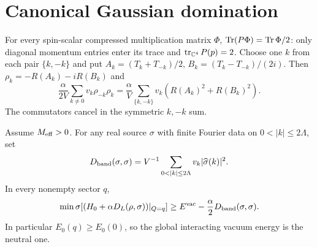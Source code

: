 \section{Canonical Gaussian domination}
For every spin-scalar compressed multiplication matrix $\Phi$,
$\operatorname{Tr}(P\Phi)=\operatorname{Tr}\Phi/2$: only diagonal momentum entries enter its trace
and $\operatorname{tr}_{\mathbb C^4}P(p)=2$.
Choose one $k$ from each pair $\{k,-k\}$ and put
$A_k=(T_k+T_{-k})/2$, $B_k=(T_k-T_{-k})/(2i)$.
Then $\rho_k=-R(A_k)-iR(B_k)$ and
\begin{equation}
\frac{\alpha}{2V}\sum_{k\ne0}v_k\rho_{-k}\rho_k
=\frac\alpha V\sum_{\{k,-k\}}v_k
\left(R(A_k)^2+R(B_k)^2\right).
\label{eq:squares}
\end{equation}
The commutators cancel in the symmetric $k,-k$ sum.

\begin{theorem}\label{thm:gd}
Assume $M_{\rm eff}>0$. For any real source $\sigma$ with finite
Fourier data on $0<|k|\le2\Lambda$, set
\[
D_{\rm band}(\sigma,\sigma)=V^{-1}
\sum_{0<|k|\le2\Lambda}v_k|\widehat\sigma(k)|^2 .
\]
In every nonempty sector $q$,
\begin{equation}
\min\sigma\!\left[
(H_0+\alpha D_L(\rho,\sigma))|_{Q=q}\right]
\ge E^{\mathrm{vac}}-\frac\alpha2D_{\rm band}(\sigma,\sigma).
\label{eq:gd}
\end{equation}
In particular $E_0(q)\ge E_0(0)$, so the global interacting vacuum
energy is the neutral one.
\end{theorem}
